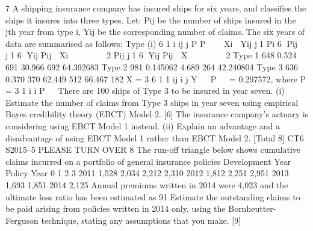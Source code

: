 \documentclass[a4paper,12pt]{article}
\begin{document}
\begin{enumerate}
7 A shipping insurance company has insured ships for six years, and classifies the
ships it insures into three types.
Let:
  Pij be the number of ships insured in the jth year from type i,
Yij be the corresponding number of claims.
The six years of data are summarised as follows:
  Type (i)
6
1
i ij
j
P P

  Xi 
Yij
j1 Pi
6
Pij
j1
6
Yij
Pij
 Xi






2
Pij
j1
6
Yij
Pij
 X






2
Type 1 648 0.524 691 30.966 692 64.392683
Type 2 981 0.145062 4.689 264 42.240804
Type 3 636 0.370 370 62.449 512 66.467 182
X =
  3 6
1 1
ij
i j
Y
  P
  = 0.297572, where P =
  3
1
i
i
P
 
There are 100 ships of Type 3 to be insured in year seven.
(i) Estimate the number of claims from Type 3 ships in year seven using
empirical Bayes credibility theory (EBCT) Model 2. [6]
The insurance company’s actuary is considering using EBCT Model 1 instead.
(ii) Explain an advantage and a disadvantage of using EBCT Model 1 rather
than EBCT Model 2. 
[Total 8]
CT6 S2015–5 PLEASE TURN OVER
8 The run-off triangle below shows cumulative claims incurred on a portfolio of
general insurance policies
Development Year
Policy Year 0 1 2 3
2011 1,528 2,034 2,212 2,310
2012 1,812 2,251 2,951
2013 1,693 1,851
2014 2,125
Annual premiums written in 2014 were 4,023 and the ultimate loss ratio has been
estimated as 91%
Estimate the outstanding claims to be paid arising from policies written in 2014
only, using the Bornheutter-Ferguson technique, stating any assumptions that you
make. [9]



\end{enumerate}
\end{document}
